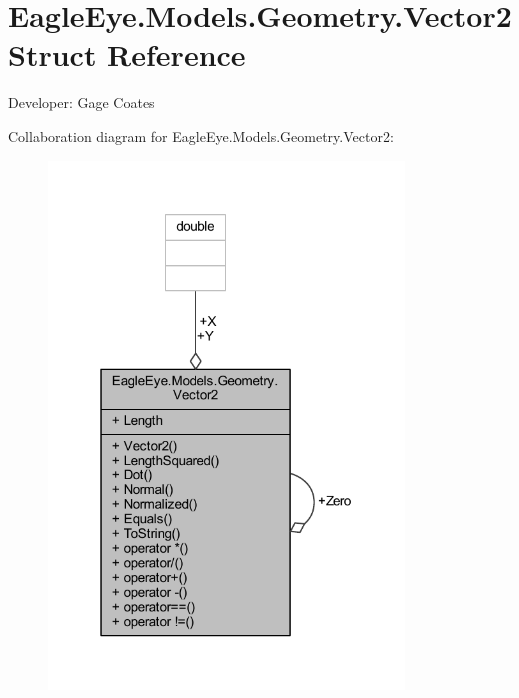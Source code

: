 \hypertarget{struct_eagle_eye_1_1_models_1_1_geometry_1_1_vector2}{}\section{Eagle\+Eye.\+Models.\+Geometry.\+Vector2 Struct Reference}
\label{struct_eagle_eye_1_1_models_1_1_geometry_1_1_vector2}


Developer\+: Gage Coates  




Collaboration diagram for Eagle\+Eye.\+Models.\+Geometry.\+Vector2\+:\nopagebreak
\begin{figure}[H]
\begin{center}
\leavevmode
\includegraphics[width=268pt]{struct_eagle_eye_1_1_models_1_1_geometry_1_1_vector2__coll__graph}
\end{center}
\end{figure}

